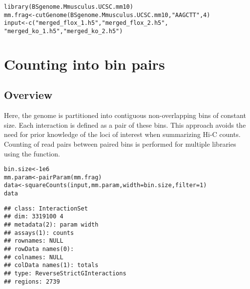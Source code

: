 \documentclass{report}\usepackage[]{graphicx}\usepackage[usenames,dvipsnames]{color}
\newcommand{\hlnum}[1]{\textcolor[rgb]{0.816,0.125,0.439}{#1}}%
\newcommand{\hlstr}[1]{\textcolor[rgb]{0.251,0.627,0.251}{#1}}%
\newcommand{\hlstd}[1]{\textcolor[rgb]{0.251,0.251,0.251}{#1}}%
\newcommand{\hlkwb}[1]{\textcolor[rgb]{0,0,0}{#1}}%
\newcommand{\hlkwc}[1]{\textcolor[rgb]{0.251,0.251,0.251}{#1}}%
\newcommand{\hlkwd}[1]{\textcolor[rgb]{0.878,0.439,0.125}{#1}}%
\newenvironment{knitrout}{}{} %
\begin{document}
\begin{knitrout}
\color{fgcolor}\begin{kframe}
\begin{alltt}
\hlkwd{library}\hlstd{(BSgenome.Mmusculus.UCSC.mm10)}
\hlstd{mm.frag} \hlkwb{<-} \hlkwd{cutGenome}\hlstd{(BSgenome.Mmusculus.UCSC.mm10,} \hlstr{"AAGCTT"}\hlstd{,} \hlnum{4}\hlstd{)}
\hlstd{input} \hlkwb{<-} \hlkwd{c}\hlstd{(}\hlstr{"merged_flox_1.h5"}\hlstd{,} \hlstr{"merged_flox_2.h5"}\hlstd{,}
           \hlstr{"merged_ko_1.h5"}\hlstd{,} \hlstr{"merged_ko_2.h5"}\hlstd{)}
\end{alltt}
\end{kframe}
\end{knitrout}

\section{Counting into bin pairs}

\subsection{Overview}
Here, the genome is partitioned into contiguous non-overlapping bins of constant size.
Each interaction is defined as a pair of these bins.
This approach avoids the need for prior knowledge of the loci of interest when summarizing Hi-C counts.
Counting of read pairs between paired bins is performed for multiple libraries using the  function.

\begin{knitrout}
\color{fgcolor}\begin{kframe}
\begin{alltt}
\hlstd{bin.size} \hlkwb{<-} \hlnum{1e6}
\hlstd{mm.param} \hlkwb{<-} \hlkwd{pairParam}\hlstd{(mm.frag)}
\hlstd{data} \hlkwb{<-} \hlkwd{squareCounts}\hlstd{(input, mm.param,} \hlkwc{width}\hlstd{=bin.size,} \hlkwc{filter}\hlstd{=}\hlnum{1}\hlstd{)}
\hlstd{data}
\end{alltt}
\begin{verbatim}
## class: InteractionSet 
## dim: 3319100 4 
## metadata(2): param width
## assays(1): counts
## rownames: NULL
## rowData names(0):
## colnames: NULL
## colData names(1): totals
## type: ReverseStrictGInteractions
## regions: 2739
\end{verbatim}
\end{kframe}
\end{knitrout}
\end{document}
